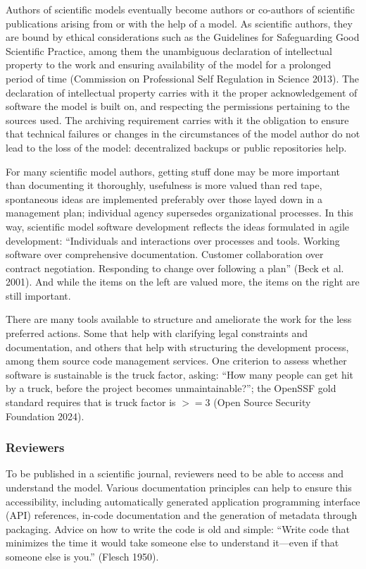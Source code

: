 \documentclass[preprint,11pt,5p]{elsarticle}
\begin{document}
Authors of scientific models eventually become authors or co-authors of
scientific publications arising from or with the help of a model. As
scientific authors, they are bound by ethical considerations such as the
Guidelines for Safeguarding Good Scientific Practice, among them the
unambiguous declaration of intellectual property to the work and
ensuring availability of the model for a prolonged period of time
(Commission on Professional Self Regulation in Science 2013). The
declaration of intellectual property carries with it the proper
acknowledgement of software the model is built on, and respecting the
permissions pertaining to the sources used. The archiving requirement
carries with it the obligation to ensure that technical failures or
changes in the circumstances of the model author do not lead to the loss
of the model: decentralized backups or public repositories help.

For many scientific model authors, getting stuff done may be more
important than documenting it thoroughly, usefulness is more valued than
red tape, spontaneous ideas are implemented preferably over those layed
down in a management plan; individual agency supersedes organizational
processes. In this way, scientific model software development reflects
the ideas formulated in agile development: ``Individuals and
interactions over processes and tools. Working software over
comprehensive documentation. Customer collaboration over contract
negotiation. Responding to change over following a plan'' (Beck et al.
2001). And while the items on the left are valued more, the items on the
right are still important.

There are many tools available to structure and ameliorate the work for
the less preferred actions. Some that help with clarifying legal
constraints and documentation, and others that help with structuring the
development process, among them source code management services. One
criterion to assess whether software is sustainable is the truck factor,
asking: ``How many people can get hit by a truck, before the project
becomes unmaintainable?''; the OpenSSF gold standard requires that is
truck factor is \(>= 3\) (Open Source Security Foundation 2024).

\subsubsection{Reviewers}\label{reviewers}

To be published in a scientific journal, reviewers need to be able to
access and understand the model. Various documentation principles can
help to ensure this accessibility, including automatically generated
application programming interface (API) references, in-code
documentation and the generation of metadata through packaging. Advice
on how to write the code is old and simple: ``Write code that minimizes
the time it would take someone else to understand it---even if that
someone else is you.'' (Flesch 1950).
\end{document}
